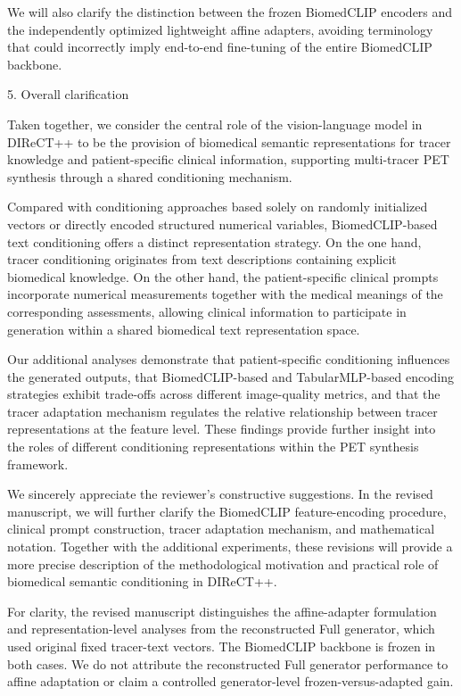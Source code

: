 {We will also clarify the distinction between the frozen BiomedCLIP encoders and the independently optimized lightweight affine adapters, avoiding terminology that could incorrectly imply end-to-end fine-tuning of the entire BiomedCLIP backbone.

5. Overall clarification

Taken together, we consider the central role of the vision-language model in DIReCT++ to be the provision of biomedical semantic representations for tracer knowledge and patient-specific clinical information, supporting multi-tracer PET synthesis through a shared conditioning mechanism.

Compared with conditioning approaches based solely on randomly initialized vectors or directly encoded structured numerical variables, BiomedCLIP-based text conditioning offers a distinct representation strategy. On the one hand, tracer conditioning originates from text descriptions containing explicit biomedical knowledge. On the other hand, the patient-specific clinical prompts incorporate numerical measurements together with the medical meanings of the corresponding assessments, allowing clinical information to participate in generation within a shared biomedical text representation space.

Our additional analyses demonstrate that patient-specific conditioning influences the generated outputs, that BiomedCLIP-based and TabularMLP-based encoding strategies exhibit trade-offs across different image-quality metrics, and that the tracer adaptation mechanism regulates the relative relationship between tracer representations at the feature level. These findings provide further insight into the roles of different conditioning representations within the PET synthesis framework.

We sincerely appreciate the reviewer’s constructive suggestions. In the revised manuscript, we will further clarify the BiomedCLIP feature-encoding procedure, clinical prompt construction, tracer adaptation mechanism, and mathematical notation. Together with the additional experiments, these revisions will provide a more precise description of the methodological motivation and practical role of biomedical semantic conditioning in DIReCT++.

For clarity, the revised manuscript distinguishes the affine-adapter formulation and representation-level analyses from the reconstructed Full generator, which used original fixed tracer-text vectors. The BiomedCLIP backbone is frozen in both cases. We do not attribute the reconstructed Full generator performance to affine adaptation or claim a controlled generator-level frozen-versus-adapted gain.}

